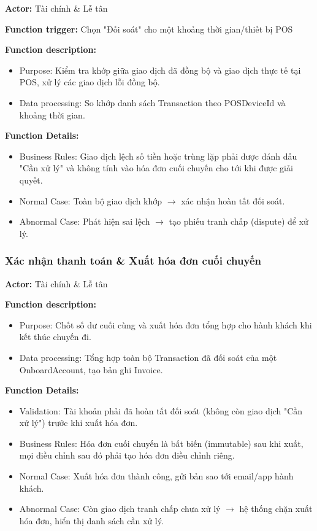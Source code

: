 \noindent\textbf{Actor:} Tài chính \& Lễ tân

\noindent\textbf{Function trigger:} Chọn "Đối soát" cho một khoảng thời gian/thiết bị POS

\noindent\textbf{Function description:}
\begin{itemize}
    \item Purpose: Kiểm tra khớp giữa giao dịch đã đồng bộ và giao dịch thực tế tại POS, xử lý các giao dịch lỗi đồng bộ.
    \item Data processing: So khớp danh sách Transaction theo POSDeviceId và khoảng thời gian.
\end{itemize}

\noindent\textbf{Function Details:}
\begin{itemize}
    \item Business Rules: Giao dịch lệch số tiền hoặc trùng lặp phải được đánh dấu "Cần xử lý" và không tính vào hóa đơn cuối chuyến cho tới khi được giải quyết.
    \item Normal Case: Toàn bộ giao dịch khớp $\rightarrow$ xác nhận hoàn tất đối soát.
    \item Abnormal Case: Phát hiện sai lệch $\rightarrow$ tạo phiếu tranh chấp (dispute) để xử lý.
\end{itemize}

\subsubsection{Xác nhận thanh toán \& Xuất hóa đơn cuối chuyến}

\noindent\textbf{Actor:} Tài chính \& Lễ tân

\noindent\textbf{Function description:}
\begin{itemize}
    \item Purpose: Chốt số dư cuối cùng và xuất hóa đơn tổng hợp cho hành khách khi kết thúc chuyến đi.
    \item Data processing: Tổng hợp toàn bộ Transaction đã đối soát của một OnboardAccount, tạo bản ghi Invoice.
\end{itemize}

\noindent\textbf{Function Details:}
\begin{itemize}
    \item Validation: Tài khoản phải đã hoàn tất đối soát (không còn giao dịch "Cần xử lý") trước khi xuất hóa đơn.
    \item Business Rules: Hóa đơn cuối chuyến là bất biến (immutable) sau khi xuất, mọi điều chỉnh sau đó phải tạo hóa đơn điều chỉnh riêng.
    \item Normal Case: Xuất hóa đơn thành công, gửi bản sao tới email/app hành khách.
    \item Abnormal Case: Còn giao dịch tranh chấp chưa xử lý $\rightarrow$ hệ thống chặn xuất hóa đơn, hiển thị danh sách cần xử lý.
\end{itemize}

